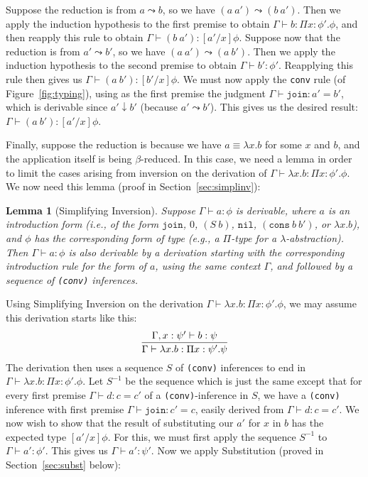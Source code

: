 \documentclass[copyright]{eptcs}
\newtheorem{lemma}{Lemma}
\newcommand{\nil}[0]{\texttt{nil}}
\newcommand{\cons}[0]{\texttt{cons}}
\newcommand{\join}[0]{\texttt{join}}
\begin{document}
\noindent Suppose the reduction is from $a\leadsto b$, so we have
$(a\ a')\leadsto(b\ a')$.  Then we apply the induction hypothesis to
the first premise to obtain $\Gamma \vdash b:\Pi x:\phi'.\phi$, and
then reapply this rule to obtain $\Gamma \vdash (b\ a') : [a'/x]\phi$.
Suppose now that the reduction is from $a'\leadsto b'$, so we have
$(a\ a')\leadsto(a\ b')$.  Then we apply the induction hypothesis to
the second premise to obtain $\Gamma\vdash b':\phi'$.  Reapplying this
rule then gives us $\Gamma \vdash (a\ b') : [b'/x]\phi$.  We must now
apply the \texttt{conv} rule (of Figure~\ref{fig:typing}), using as
the first premise the judgment $\Gamma \vdash \join : a' = b'$, which
is derivable since $a'\downarrow b'$ (because $a'\leadsto b'$).  This gives
us the desired result: $\Gamma \vdash (a\ b') : [a'/x]\phi$.

Finally, suppose the reduction is because we have $a \equiv \lambda
x.b$ for some $x$ and $b$, and the application itself is being
$\beta$-reduced.  In this case, we need a lemma in order to limit the
cases arising from inversion on the derivation of $\Gamma\vdash
\lambda x.b:\Pi x:\phi'.\phi$.  We now need this lemma (proof in
Section~\ref{sec:simplinv}):

\begin{lemma}[Simplifying Inversion]
\label{lem:simplinv}
Suppose $\Gamma\vdash a:\phi$ is derivable, where $a$ is an
introduction form (i.e., of the form $\join$, $0$, $(S\ b)$, $\nil$,
$(\cons\ b\ b')$, or $\lambda x.b$), and $\phi$ has the corresponding
form of type (e.g., a $\Pi$-type for a $\lambda$-abstraction).  Then
$\Gamma\vdash a:\phi$ is also derivable by a derivation starting with
the corresponding introduction rule for the form of $a$, using the
same context $\Gamma$, and followed by a sequence of \texttt{(conv)}
inferences.
\end{lemma}

\noindent Using Simplifying Inversion on the derivation $\Gamma\vdash
\lambda x.b:\Pi x:\phi'.\phi$, we may assume this derivation starts
like this:
\[
\infer{\Gamma\vdash\lambda x.b:\Pi x:\psi'.\psi}
      {\Gamma,x:\psi'\vdash b:\psi}
\]
\noindent The derivation then uses a sequence $S$ of \texttt{(conv)}
inferences to end in $\Gamma\vdash \lambda x.b:\Pi x:\phi'.\phi$.  Let
$S^{-1}$ be the sequence which is just the same except that for every
first premise $\Gamma\vdash d:c = c'$ of a \texttt{(conv)}-inference
in $S$, we have a \texttt{(conv)} inference with first premise
$\Gamma\vdash \join:c' = c$, easily derived from $\Gamma\vdash d:c =
c'$.  We now wish to show that the result of substituting our $a'$ for
$x$ in $b$ has the expected type $[a'/x]\phi$.  For this, we must
first apply the sequence $S^{-1}$ to $\Gamma\vdash a':\phi'$.  This
gives us $\Gamma\vdash a':\psi'$.  Now we apply Substitution (proved
in Section~\ref{sec:subst} below):
\end{document}
